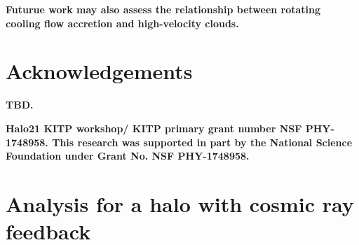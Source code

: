 \documentclass[fleqn,usenatbib]{mnras}
\begin{document}
\textbf{Futurue work may also assess the relationship between rotating cooling flow accretion and high-velocity clouds.}

\section*{Acknowledgements}

\textbf{TBD.}

\textbf{Halo21 KITP workshop/ KITP primary grant number NSF PHY-1748958.
This research was supported in part by the National Science Foundation under Grant No. NSF PHY-1748958.
}










\appendix

\section{Analysis for a halo with cosmic ray feedback}
\label{s: appendix-crs}
\end{document}
